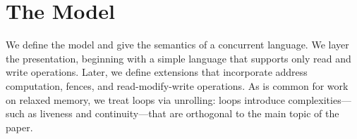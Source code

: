 \section{The Model}
\label{sec:model:intro}

We define the model and give the semantics of a concurrent language.  We
layer the presentation, beginning with a simple language that supports only
read and write operations.  Later, we define extensions that incorporate
address computation, fences, and read-modify-write operations.  As is common
for work on relaxed memory, we treat loops via unrolling: loops introduce
complexities---such as liveness and continuity---that are orthogonal to the
main topic of the paper.
\begin{comment}
https://preshing.com/20131125/acquire-and-release-fences-dont-work-the-way-youd-expect/

Cannot encode R/A actions with actions+fences...

A release operation prevents preceding memory operations from being delayed
past it (a;Rel =/=> Rel;a)
 
A release fence prevents preceding memory operations from being delayed past
subsequent writes (a;FR;w =/=> w;a;FR)

An acquire operation prevents subsequent memory operations from being advanced
before it (Acq;a =/=> a;Acq)

An acquire fence prevents subsequent memory operations from being advanced
before prior reads (r;FA;a =/=> FA;a;r)

https://www.modernescpp.com/index.php/fences-as-memory-barriers

StoreLoad: Full fence allows a store before to be reordered with respect to a
load after (wx;F;ry) ===> (ry;F;wx)

StoreLoad+LoadLoad: Release fence also allows (rx;FR;ry) ===> (ry;FR;rx)

StoreLoad+StoreStore: Acquire fence also allows (wx;FR;wy) ===> (wy;FR;wx)

LoadStore: No fence allows a prior load to reorder w.r.t. a subsequent store
(rx;FR;wy) =/=> (wy;FR;rx)

https://preshing.com/20120710/memory-barriers-are-like-source-control-operations/
Good news is that a fullFence does it.

Bizarrely, it seems this is not supported in C++... You have to go to assembly.
\end{comment}

